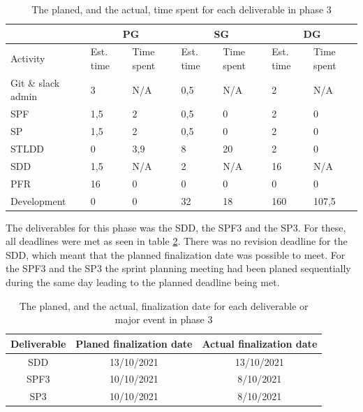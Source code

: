 \documentclass{article}
\begin{document}
\begin{table}[h!]
    \centering
    \begin{tabular}{l|l|l|l|l|l|l|}
    \cline{2-7}
    & \multicolumn{2}{c|}{PG} & \multicolumn{2}{c|}{SG} & \multicolumn{2}{c|}{DG} \\ \hline
    \multicolumn{1}{|l|}{Activity} & Est. time & Time spent &  Est. time & Time spent & Est. time & Time spent        \\ \hline
    \multicolumn{1}{|l|}{Git \& slack admin} & 3 & N/A & 0,5 & N/A  & 2 & N/A\\ \hline
    \multicolumn{1}{|l|}{SPF} & 1,5 & 2 & 0,5 & 0 & 2 & 0 \\ \hline
    \multicolumn{1}{|l|}{SP} & 1,5 & 2 & 0,5 & 0 & 2 & 0 \\ \hline
    \multicolumn{1}{|l|}{STLDD} & 0 & 3,9 & 8 & 20 & 2 & 0 \\ \hline
    \multicolumn{1}{|l|}{SDD} & 1,5 & N/A & 2 & N/A & 16 & N/A\\ \hline    
    \multicolumn{1}{|l|}{PFR} & 16 & 0 & 0 & 0 & 0 & 0\\ \hline
   \multicolumn{1}{|l|}{Development} & 0 & 0 & 32 & 18 & 160 & 107,5 \\ \hline    
\end{tabular}
\caption{The planed, and the actual, time spent for each deliverable in phase 3}
\label{tab:timeSpent3}
\end{table}

The deliverables for this phase was the SDD, the SPF3 and the SP3. For these, all deadlines were met as seen in table \ref{tab:deadlines3}. There was no revision deadline for the SDD, which meant that the planned finalization date was possible to meet. For the SPF3 and the SP3 the sprint planning meeting had been planed sequentially during the same day leading to the planned deadline being met. 

\begin{table}[h!]
    \centering
    \begin{tabular}{|c|c|c|}
    \hline
    Deliverable & Planed finalization date & Actual finalization date \\ \hline\hline
    SDD & 13/10/2021 & 13/10/2021 \\ \hline
    SPF3 & 10/10/2021 & 8/10/2021 \\ \hline
    SP3 & 10/10/2021 & 8/10/2021 \\ \hline
    \end{tabular}
    \caption{The planed, and the actual, finalization date for each deliverable or major event in phase 3}
    \label{tab:deadlines3}
\end{table}
\end{document}
